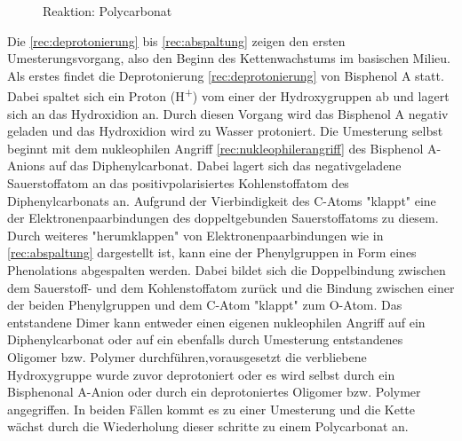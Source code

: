 \begin{figure}[h]
    \begin{center}
        \footnotesize
        \setatomsep{1.7em}


        \vspace{10pt}

        \chemrel{->}

        \caption{Reaktion: Polycarbonat}
        \label{rec:polycarbonat}
    \end{center}
\end{figure}

Die \autoref{rec:deprotonierung} bis \autoref{rec:abspaltung} zeigen den ersten
Umesterungsvorgang, also den Beginn des Kettenwachstums im basischen Milieu. Als
erstes findet die Deprotonierung \autoref{rec:deprotonierung} von Bisphenol A
statt. Dabei spaltet sich ein Proton (H\textsuperscript{+}) vom einer der
Hydroxygruppen ab und lagert sich an das Hydroxidion an. Durch diesen Vorgang
wird das Bisphenol A negativ geladen und das Hydroxidion wird zu Wasser
protoniert. Die Umesterung selbst beginnt mit dem nukleophilen Angriff
\autoref{rec:nukleophilerangriff} des Bisphenol A-Anions auf das
Diphenylcarbonat. Dabei lagert sich das negativgeladene Sauerstoffatom an das
positivpolarisiertes Kohlenstoffatom des Diphenylcarbonats an. Aufgrund der
Vierbindigkeit des C-Atoms "klappt" eine der
Elektronenpaarbindungen des doppeltgebunden Sauerstoffatoms zu diesem. Durch
weiteres "herumklappen" von
Elektronenpaarbindungen wie in \autoref{rec:abspaltung} dargestellt ist, kann
eine der Phenylgruppen in Form eines Phenolations abgespalten werden. Dabei
bildet sich die Doppelbindung zwischen dem Sauerstoff- und dem Kohlenstoffatom
zurück und die Bindung zwischen einer der beiden Phenylgruppen und dem C-Atom
"klappt" zum O-Atom. Das entstandene Dimer kann
entweder einen eigenen nukleophilen Angriff auf ein Diphenylcarbonat oder auf
ein ebenfalls durch Umesterung entstandenes Oligomer bzw. Polymer
durchführen,vorausgesetzt die verbliebene Hydroxygruppe wurde zuvor deprotoniert
oder es wird selbst durch ein Bisphenonal A-Anion oder durch ein deprotoniertes
Oligomer bzw. Polymer angegriffen. In beiden Fällen kommt es zu einer Umesterung
und die Kette wächst durch die Wiederholung dieser schritte zu einem
Polycarbonat an.

